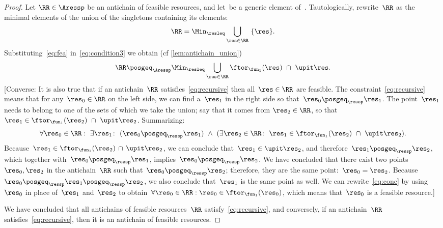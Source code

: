 \begin{proof}
    Let $\RR\in\Aressp$ be an antichain of feasible resources, and
    let~\res be a generic element of~\ressp.
    Tautologically, rewrite~$\RR$
    as the minimal elements of the union of the singletons containing
    its elements:
    \begin{equation}
        \RR=\Min_{\resleq}\bigcup_{\res\in\RR}\ \{\res\}.\label{eq:condition3}
    \end{equation}
    Substituting~\cref{eq:fea} in~\cref{eq:condition3} we obtain (cf
    \cref{lem:antichain_union})
    \begin{equation}
        \RR\posgeq_{\Aressp}\Min_{\resleq}\bigcup_{\res\in\RR}\ftor_{\fun_{1}}(\res)\ \cap\ \upit\res.\label{eq:recursive}
    \end{equation}
    {[}Converse: It is also true that if an antichain~$\RR$ satisfies~\cref{eq:recursive}
    then all~$\res\in\RR$ are feasible.
    The constraint~\cref{eq:recursive}
    means that for any~$\res_{0}\in\RR$ on the left side, we can find
    a~$\res_{1}$ in the right side so that~$\res_{0}\posgeq_{\ressp}\res_{1}$.
    The point~$\res_{1}$ needs to belong to one of the sets of which
    we take the union; say that it comes from $\res_{2}\in\RR$, so
    that $\res_{1}\in\ftor_{\fun_{1}}(\res_{2})\ \cap\ \upit\res_{2}$.
    Summarizing:
        {
        \begin{equation}
            \forall\res_{0}\in\RR:\ \exists\res_{1}\colon\ (\res_{0}\posgeq_{\ressp}\res_{1})\ \wedge\ (\exists\res_{2}\in\RR\colon\ \res_{1}\in\ftor_{\fun_{1}}(\res_{2})\ \cap\ \upit\res_{2}).\label{eq:conc}
        \end{equation}
    }Because~$\res_{1}\in\ftor_{\fun_{1}}(\res_{2})\,\cap\,\upit\res_{2}$,
    we can conclude that~$\res_{1}\in\upit\res_{2}$, and therefore~$\res_{1}\posgeq_{\ressp}\res_{2}$,
    which together with~$\res_{0}\posgeq_{\ressp}\res_{1}$, implies~$\res_{0}\posgeq_{\ressp}\res_{2}$.
    We have concluded that there exist two points~$\res_{0},\res_{2}$
    in the antichain~$\RR$ such that~$\res_{0}\posgeq_{\ressp}\res_{2}$;
    therefore, they are the same point:~$\res_{0}=\res_{2}$.
    Because~$\res_{0}\posgeq_{\ressp}\res_{1}\posgeq_{\ressp}\res_{2}$,
    we also conclude that~$\res_{1}$ is the same point as well.
    We can
    rewrite~\cref{eq:conc} by using~$\res_{0}$ in place of~$\res_{1}$
    and~$\res_{2}$ to obtain~$\forall\res_{0}\in\RR:\res_{0}\in\ftor_{\fun_{1}}(\res_{0})$,
    which means that~$\res_{0}$ is a feasible resource.{]}
    
    We have concluded that all antichains of feasible resources~$\RR$
    satisfy~\cref{eq:recursive}, and conversely, if an antichain~$\RR$
    satisfies~\cref{eq:recursive}, then it is an antichain of feasible
    resources.
    

\end{proof}

